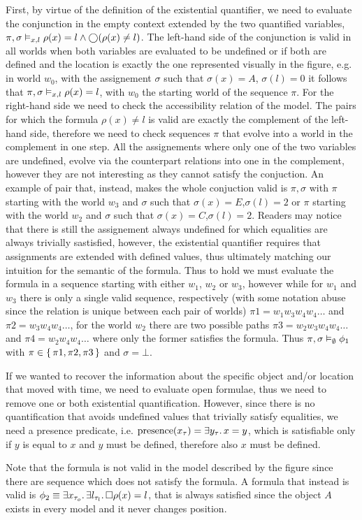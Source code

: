First, by virtue of the definition of the existential quantifier, we need to evaluate the conjunction in the empty context extended by the two quantified variables, ${\pi}, {\sigma} \vDash_{x,l} {\rho(x) = l \land \bigcirc{(\rho(x) \neq l)}}$.
The left-hand side of the conjunction is valid in all worlds when both variables are evaluated to be undefined or if both are defined and the location is exactly the one represented visually in the figure, e.g. in world $w_0$, with the assignement $\sigma$ such that $\sigma(x) = A$, $\sigma(l) = 0$ it follows that ${\pi}, {\sigma} \vDash_{x,l} {\rho(x) = l}$, with $w_0$ the starting world of the sequence $\pi$.
For the right-hand side we need to check the accessibility relation of the model. The pairs for which the formula $\rho(x) \neq l$ is valid are exactly the complement of the left-hand side, therefore we need to check sequences $\pi$ that evolve into a world in the complement in one step.
All the assignements where only one of the two variables are undefined, evolve via the counterpart relations into one in the complement, however they are not interesting as they cannot satisfy the conjuction.
An example of pair that, instead, makes the whole conjuction valid is $\pi, \sigma$ with $\pi$ starting with the world
$w_3$ and $\sigma$ such that $\sigma(x) = E$,$\sigma(l) = 2$ or $\pi$ starting with the world $w_2$ and $\sigma$ such
that $\sigma(x) = C$,$\sigma(l) = 2$.
Readers may notice that there is still the assignement always undefined for which equalities are always trivially sastisfied, however, the existential quantifier requires that assignments are extended with defined values, thus ultimately matching our intuition for the semantic of the formula.
Thus to hold we must evaluate the formula in a sequence starting with either $w_1$, $w_2$ or $w_3$, however while for
$w_1$ and $w_3$ there is only a single valid sequence, respectively (with some notation abuse since the relation is
unique between each pair of worlds) $\pi1 = w_1w_3w_4w_4\ldots$ and $\pi2 = w_3w_4w_4\ldots$, for the world $w_2$ there
are two possible paths $\pi3 = w_2w_3w_4w_4\ldots$ and $\pi4 = w_2w_4w_4\ldots$ where only the former satisfies the
formula. Thus ${\pi}, {\sigma} \vDash_{\emptyset} {\phi_1}$ with $\pi \in \set{\pi1, \pi2, \pi3}$ and $\sigma = \bot$.

If we wanted to recover the information about the specific object and/or location that moved with time, we need to evaluate open
formulae, thus we need to remove one or both existential quantification. However, since there is no quantification that
avoids undefined values that trivially satisfy equalities, we need a presence predicate, i.e. $\text{presence}(x_\tau) =
\exists {y_\tau} \ldotp {x = y}$, which is satisfiable only if $y$ is equal to $x$ and $y$ must be defined, therefore
also $x$ must be defined.

Note that the formula is not valid in the model described by the figure since there are sequence which does not satisfy
the formula. A formula that instead is valid is $\phi_2 \equiv \exists {x_{\tau_o}} \ldotp {\exists {l_{\tau_l}} \ldotp {\Box{\rho(x)
= l}}}$, that is always satisfied since the object $A$ exists in every model and it never changes position.
